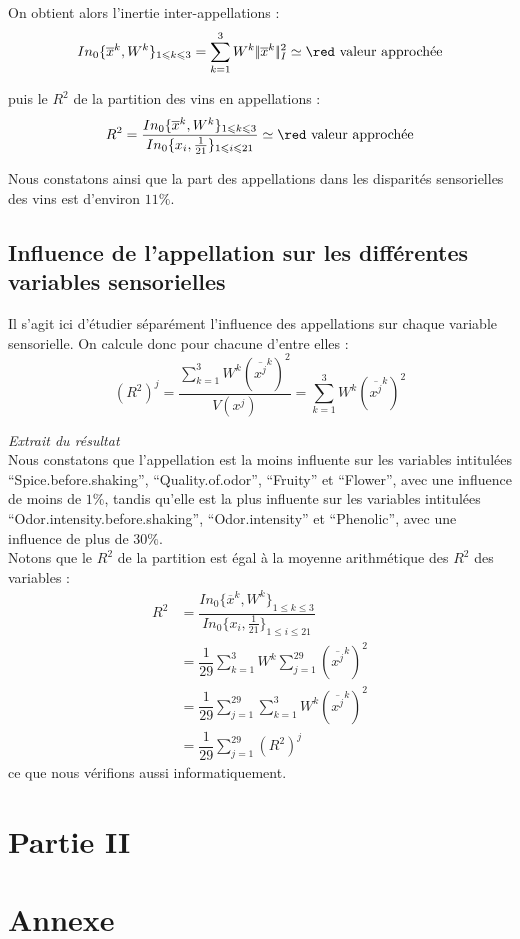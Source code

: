 \documentclass[a4paper,10pt]{article}
\newcommand{\dsum}[2]{\displaystyle\sum_{#1}^{#2}}
\begin{document}
On obtient alors l'inertie inter-appellations : 
$$In_{0}\{\overline x^k,W^k\}_{1\leqslant k\leqslant 3}=\dsum{k=1}3W^k|\!|\overline x^k|\!|_I^2\simeq \text{\red valeur approchée}$$

puis le $R^2$ de la partition des vins en appellations : 
$$R^2=\dfrac{In_{0}\{\overline x^k,W^k\}_{1\leqslant k\leqslant 3}}{In_0\{x_i,\frac 1{21}\}_{1\leqslant i\leqslant 21}}\simeq \text{\red valeur approchée}$$

Nous constatons ainsi que la part des appellations dans les disparités sensorielles des vins est d'environ $11\%$.

\subsection{Influence de l'appellation sur les différentes variables sensorielles}

Il s'agit ici d'étudier séparément l'influence des appellations sur chaque variable sensorielle. On calcule donc pour chacune d'entre elles :
$$(R^2)^j=\dfrac{\dsum{k=1}3W^k(\overline{x^j}^k)^2}{V(x^j)}=\dsum{k=1}3W^k(\overline{x^j}^k)^2$$

\textit{Extrait du résultat}\\

Nous constatons que l'appellation est la moins influente sur les variables intitulées ``Spice.before.shaking'', ``Quality.of.odor'', ``Fruity'' et ``Flower'', avec une influence de moins de $1\%$, tandis qu'elle est la plus influente sur les variables intitulées ``Odor.intensity.before.shaking'', ``Odor.intensity'' et ``Phenolic'', avec une influence de plus de $30\%$. \\

Notons que le $R^2$ de la partition est égal à la moyenne arithmétique des $R^2$ des variables : 
$$\begin{array}{ll}
   R^2
   &=\dfrac{In_{0}\{\overline x^k,W^k\}_{1\leqslant k\leqslant 3}}{In_0\{x_i,\frac 1{21}\}_{1\leqslant i\leqslant 21}}\\
   &= \dfrac 1{29}\dsum{k=1}3W^k\dsum{j=1}{29}(\overline{x^j}^k)^2\\
   &=\dfrac 1{29}\dsum{j=1}{29}\dsum{k=1}3W^k(\overline{x^j}^k)^2\\
   &=\dfrac 1{29}\dsum{j=1}{29}(R^2)^j
  \end{array}$$
ce que nous vérifions aussi informatiquement. 



\section{Partie II}
\section{Annexe}
\end{document}
